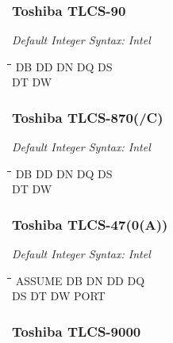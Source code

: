 \subsubsection{Toshiba TLCS-90}

{\em Default Integer Syntax: Intel}

{\tt\begin{tabbing}
\hspace{3cm}\=\hspace{3cm}\=\hspace{3cm}\=\hspace{3cm}\=\kill
DB         \> DD          \> DN         \> DQ          \> DS \\
DT         \> DW \\
\end{tabbing}}

\subsubsection{Toshiba TLCS-870(/C)}

{\em Default Integer Syntax: Intel}

{\tt\begin{tabbing}
\hspace{3cm}\=\hspace{3cm}\=\hspace{3cm}\=\hspace{3cm}\=\kill
DB         \> DD          \> DN         \> DQ          \> DS \\
DT         \> DW \\
\end{tabbing}}

\subsubsection{Toshiba TLCS-47(0(A))}

{\em Default Integer Syntax: Intel}

{\tt\begin{tabbing}
\hspace{3cm}\=\hspace{3cm}\=\hspace{3cm}\=\hspace{3cm}\=\kill
ASSUME     \> DB          \> DN         \> DD          \> DQ \\
DS         \> DT          \> DW         \> PORT \\
\end{tabbing}}

\subsubsection{Toshiba TLCS-9000}

